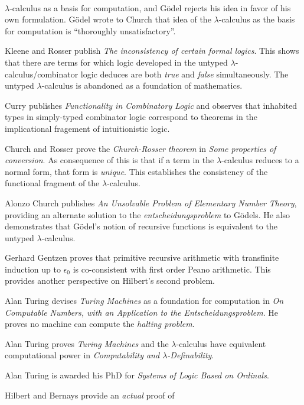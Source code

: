 \documentclass{beamer}
\begin{document}
\begin{frame}[allowframebreaks]{\insertsectionhead\ \textemdash\
    \insertsubsectionhead}
\begin{description}
    $\lambda$-calculus as a basis for computation, and G\"odel rejects
    his idea in favor of his own formulation.  G\"odel wrote to Church
    that idea of the $\lambda$-calculus as the basis for computation
    is ``thoroughly unsatisfactory''.
  \item[1935] Kleene and Rosser publish \emph{The inconsistency of
      certain formal logics}. This shows that there are terms for
    which logic developed in the untyped $\lambda$-calculus/combinator
    logic deduces are both \emph{true} and \emph{false}
    simultaneously. The untyped $\lambda$-calculus is abandoned as a
    foundation of mathematics.
  \item[1936] Curry publishes \emph{Functionality in Combinatory
      Logic} and observes that inhabited types in simply-typed
    combinator logic correspond to theorems in the implicational
    fragement of intuitionistic logic.
  \item[1936] Church and Rosser prove the \emph{Church-Rosser theorem}
    in \emph{Some properties of conversion}.  As consequence of this
    is that if a term in the $\lambda$-calculus reduces to a normal
    form, that form is \emph{unique}.  This establishes the
    consistency of the functional fragment of the $\lambda$-calculus.
  \item[1936] Alonzo Church publishes \emph{An Unsolvable Problem of
      Elementary Number Theory}, providing an alternate solution to
    the \emph{entscheidungsproblem} to G\"odels.  He also demonstrates
    that G\"odel's notion of recursive functions is equivalent to the
    untyped $\lambda$-calculus.
  \item[1936] Gerhard Gentzen proves that primitive recursive
    arithmetic with transfinite induction up to $\epsilon_0$ is
    co-consistent with first order Peano arithmetic. This provides
    another perspective on Hilbert's second problem.
  \item[1937] Alan Turing devises \emph{Turing Machines} as a
    foundation for computation in \emph{On Computable Numbers, with an
      Application to the Entscheidungsproblem}.  He proves no machine
    can compute the \emph{halting problem}.
  \item[1937] Alan Turing proves \emph{Turing Machines} and the
    $\lambda$-calculus have equivalent computational power in
    \emph{Computability and $\lambda$-Definability}.
  \item[1938] Alan Turing is awarded his PhD for \emph{Systems of
      Logic Based on Ordinals}.
  \item[1939] Hilbert and Bernays provide an \emph{actual} proof of

\end{description}
\end{frame}
\end{document}
